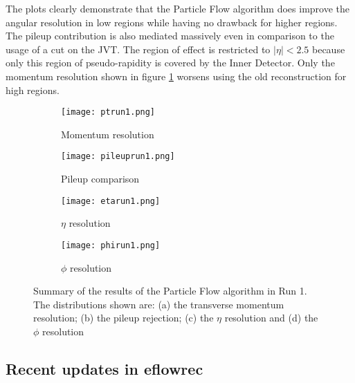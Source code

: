 The plots clearly demonstrate that the Particle Flow algorithm does improve the angular resolution in low \pT regions while having no drawback for higher \pT regions. The pileup contribution is also mediated massively even in comparison to the usage of a cut on the JVT. The region of effect is restricted to $|\eta|<\num{2.5}$ because only this region of pseudo-rapidity is covered by the Inner Detector. Only the momentum resolution shown in figure \ref{fig:ptrun1} worsens using the old reconstruction for high \pT regions.


\begin{figure}[h]
  \centering
  \begin{subfigure}[b]{0.5\figwidth}
\texttt{[image: ptrun1.png]}
\caption[Momentum resolution of Run 1 Particle Flow]{Momentum resolution}
\label{fig:ptrun1}
\end{subfigure}
\quad
  \begin{subfigure}[b]{0.5\figwidth}
  \texttt{[image: pileuprun1.png]}
  \caption[Pileup comparison of EM-Topo Jets and Particle Flow jets for Run 1 data]{Pileup comparison}
  \label{fig:pileuprun1}
  \end{subfigure}



  \begin{subfigure}[b]{0.5\figwidth}
  \texttt{[image: etarun1.png]}
  \caption[Improvements in $\eta$ resolution for Run 1 Particle Flow Jets]{$\eta$ resolution}
  \label{fig:etarun1}
  \end{subfigure}
  \quad
  \begin{subfigure}[b]{0.5\figwidth}
  \texttt{[image: phirun1.png]}
  \caption[Improvements in $\phi$ resolution for Run 1 Particle Flow Jets]{$\phi$ resolution}
  \label{fig:phirun1}
  \end{subfigure}
  \caption[Run 1 results of the Particle Flow algorithm]{Summary of the results of the Particle Flow algorithm in Run 1. The distributions shown are: (a) the transverse momentum resolution; (b) the pileup rejection; (c) the $\eta$ resolution and (d) the $\phi$ resolution \cite{pflow16}}
  \label{fig:run1res}
\end{figure}





\subsection{Recent updates in eflowrec}

